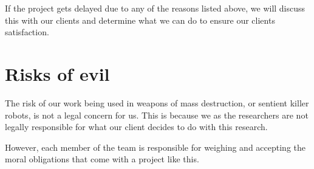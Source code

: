 If the project gets delayed due to any of the reasons listed above, we will
discuss this with our clients and determine what we can do to ensure our
clients satisfaction.

\section{Risks of evil}

The risk of our work being used in weapons of mass destruction, or sentient
killer robots, is not a legal concern for us. This is because we as the
researchers are not legally responsible for what our client decides to do with
this research.

However, each member of the team is responsible for weighing and accepting the
moral obligations that come with a project like this.
